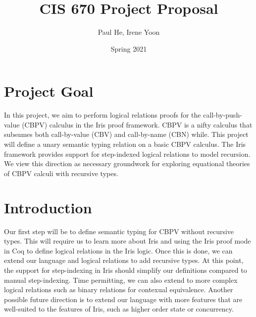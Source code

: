 \documentclass[11pt,twoside]{article}
\begin{document}
\title{CIS 670 Project Proposal}
\author{Paul He, Irene Yoon}
\date{Spring 2021}

\maketitle{}

\section{Project Goal}
In this project, we aim to perform logical relations proofs for the call-by-push-value (CBPV) calculus in the Iris proof framework.
CBPV is a nifty calculus that subsumes both call-by-value (CBV) and call-by-name (CBN) while.
This project will define a unary semantic typing relation on a basic CBPV calculus.
The Iris framework provides support for step-indexed logical relations to model recursion.
We view this direction as necessary groundwork for exploring equational theories of CBPV calculi with recursive types.

\section{Introduction}

Our first step will be to define semantic typing for CBPV without recursive types.
This will require us to learn more about Iris and using the Iris proof mode in Coq to define logical relations in the Iris logic.
Once this is done, we can extend our language and logical relations to add recursive types.
At this point, the support for step-indexing in Iris should simplify our definitions compared to manual step-indexing.
Time permitting, we can also extend to more complex logical relations such as binary relations for contexual equivalence.
Another possible future direction is to extend our language with more features that are well-suited to the features of Iris, such as higher order state or concurrency. \\
\end{document}
